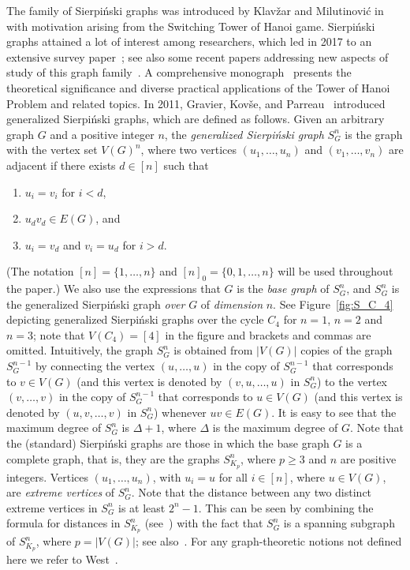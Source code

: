 \documentclass{article}
\begin{document}
The family of Sierpi\'{n}ski graphs was introduced by Klav\v zar and Milutinovi\'{c} in~\cite{klavzar-1997} with motivation arising from the Switching Tower of Hanoi game. Sierpi\'nski graphs attained a lot of interest among researchers, which led in 2017 to an extensive survey paper~\cite{hinz-2017}; see also some recent papers addressing new aspects of study of this graph family~\cite{anitha-2025,balakrishnan-2022, menon-2023}. A comprehensive monograph~\cite{hanoi} presents 
the theoretical significance and diverse practical applications of the 
Tower of Hanoi Problem and related topics. 
In 2011, Gravier, Kov\v se, and Parreau~\cite{gravier-2011} introduced generalized Sierpi\'nski graphs, which are defined as follows. Given an arbitrary graph $G$ and a positive integer $n$, the {\em generalized Sierpi\'nski graph} $S_G^n$ is the graph with the vertex set $V(G)^n$, where two vertices $(u_1,\ldots, u_n)$ and $(v_1,\ldots, v_n)$ are adjacent if there exists $d\in [n]$ such that 
\begin{enumerate}[noitemsep]
    \item $u_i = v_i$ for $i<d$, 
    \item $u_dv_d\in E(G)$, and 
    \item $u_i = v_d$ and $v_i = u_d$ for $i>d$.
\end{enumerate}
(The notation $[n]=\{1,\ldots,n\}$ and $[n]_0=\{0,1,\ldots,n\}$  will be used throughout the paper.) 
We also use the expressions that $G$ is the {\em base graph} of $S_G^n$, and $S_G^n$ is the generalized Sierpi\'nski graph {\em over} $G$ of {\em dimension} $n$. 
See Figure~\ref{fig:S_C_4} depicting generalized Sierpi\'{n}ski graphs over the cycle $C_4$ for $n=1$, $n=2$ and $n=3$; note that $V(C_4)=[4]$ in the figure and brackets and commas are omitted. Intuitively, the graph $S_G^n$ is obtained from $|V(G)|$ copies of the graph $S_G^{n-1}$ by connecting the vertex $(u,\ldots, u)$ in the copy of $S_G^{n-1}$ that corresponds to $v\in V(G)$ (and this vertex is denoted by $(v,u,\ldots, u)$ in $S_G^n$) to the vertex $(v,\ldots, v)$ in the copy of $S_G^{n-1}$  that corresponds to $u\in V(G)$ (and this vertex is denoted by $(u,v,\ldots, v)$ in $S_G^n$) whenever $uv\in E(G)$.  It is easy to see that the maximum degree of $S_G^n$ is $\Delta + 1$, where $\Delta$ is  the maximum degree of $G$. Note that the (standard) Sierpi\'{n}ski graphs are those in which the base graph $G$ is a complete graph, that is, they are the graphs $S_{K_p}^n$, where $p\ge 3$ and $n$ are positive integers. Vertices $(u_1,\ldots, u_n)$, with $u_i=u$ for all $i\in [n]$, where $u\in V(G)$, are {\em extreme vertices} of $S_G^n$. Note that the distance between any two distinct extreme vertices in $S_G^n$ is at least $2^n-1$. This can be seen by combining the formula for distances in $S_{K_p}^n$ (see~\cite[Lemma 4]{klavzar-1997}) with the fact that $S_G^n$ is a spanning subgraph of $S_{K_p}^n$, where $p=|V(G)|$; see also~\cite{err}.
For any graph-theoretic notions not defined here we refer to West~\cite{we}.
\end{document}
